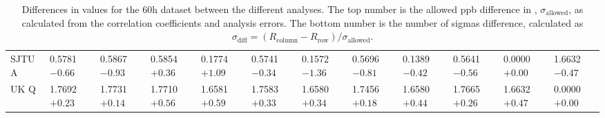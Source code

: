 \begin{landscape}
\begin{table}
\begin{tabularx}{1\linewidth}{@{\extracolsep{\fill}}lXXXXXXXXXXX}
	SJTU A & 0.5781 $-0.66$ & 0.5867 $-0.93$ & 0.5854 $+0.36$ & 0.1774 $+1.09$ & 0.5741 $-0.34$ & 0.1572 $-1.36$ & 0.5696 $-0.81$ & 0.1389 $-0.42$ & 0.5641 $-0.56$ & 0.0000 $+0.00$ & 1.6632 $-0.47$  \\
	UK Q   & 1.7692 $+0.23$ & 1.7731 $+0.14$ & 1.7710 $+0.56$ & 1.6581 $+0.59$ & 1.7583 $+0.33$ & 1.6580 $+0.34$ & 1.7456 $+0.18$ & 1.6580 $+0.44$ & 1.7665 $+0.26$ & 1.6632 $+0.47$ & 0.0000 $+0.00$  \\
  \bottomrule
\end{tabularx}
\caption[]{Differences in \R values for the 60h dataset between the different analyses. The top number is the allowed ppb difference in \R, $\sigma_{\text{allowed}}$, as calculated from the correlation coefficients and analysis errors. The bottom number is the number of sigmas difference, calculated as $\sigma_{\text{diff}} = (R_{\text{column}}-R_{\text{row}})/\sigma_{\text{allowed}}$.}
\label{tab:60h_diff}
\end{table}
\end{landscape}




